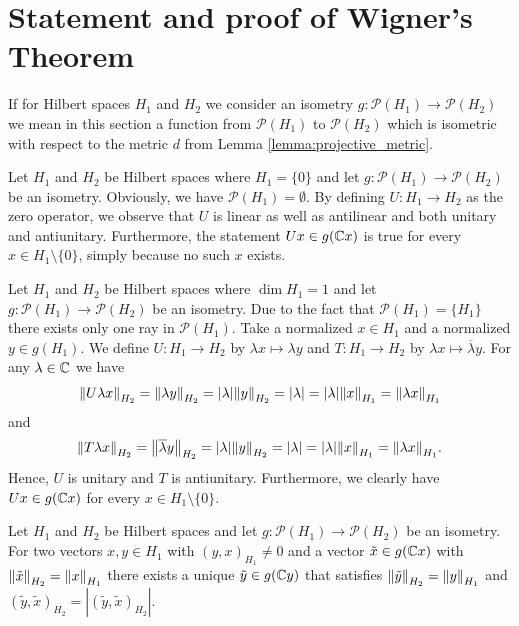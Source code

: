 \section{Statement and proof of Wigner's Theorem}

If for Hilbert spaces $H_1$ and $H_2$ we consider an isometry $g: \mathcal{P}(H_1) \to \mathcal{P}(H_2)$ we mean in this section a function from $\mathcal{P}(H_1)$ to $\mathcal{P}(H_2)$ which is isometric with respect to the metric $d$ from Lemma \ref{lemma:projective_metric}.


\begin{example} \label{example:zerodim}
	Let $H_1$ and $H_2$ be Hilbert spaces where $H_1 = \{0\}$ and let $g: \mathcal{P}(H_1) \to \mathcal{P}(H_2)$ be an isometry. Obviously, we have $\mathcal{P}(H_1) = \emptyset$. By defining $U: H_1 \to H_2$ as the zero operator, we observe that $U$ is linear as well as antilinear and both unitary and antiunitary. Furthermore, the statement $Ux \in g\pbraces{\C x}$ is true for every $x \in H_1 \setminus \{0\}$, simply because no such $x$ exists.
\end{example}


\begin{example} \label{example:onedim}
	Let $H_1$ and $H_2$ be Hilbert spaces where $\dim H_1 = 1$ and let $g: \mathcal{P}(H_1) \to \mathcal{P}(H_2)$ be an isometry. Due to the fact that $\mathcal{P}(H_1) = \{H_1\}$ there exists only one ray in $\mathcal{P}(H_1)$. Take a normalized $x \in H_1$ and a normalized $y \in g(H_1)$. We define $U: H_1 \to H_2$ by $\lambda x \mapsto \lambda y$ and $T: H_1 \to H_2$ by $\lambda x \mapsto \overline{\lambda} y$. For any $\lambda \in \C$ we have
	\begin{align*}
		\norm[H_2]{U\lambda x} = \norm[H_2]{\lambda y} = \vbraces{\lambda} \norm[H_2]{y} = \vbraces{\lambda} = \vbraces{\lambda} \norm[H_1]{x} = \norm[H_1]{\lambda x}
	\end{align*}
	and 
	\begin{align*}
		\norm[H_2]{T\lambda x} = \norm[H_2]{\overline{\lambda} y} = \vbraces{\lambda} \norm[H_2]{y} = \vbraces{\lambda} = \vbraces{\lambda} \norm[H_1]{x} = \norm[H_1]{\lambda x}.
	\end{align*}
	Hence, $U$ is unitary and $T$ is antiunitary. Furthermore, we clearly have $Ux \in g\pbraces{\C x}$ for every $x \in H_1 \setminus \{0\}$. 
\end{example}


\begin{lemma} \label{lemma:phase_adjustment_ray}
	Let $H_1$ and $H_2$ be Hilbert spaces and let $g: \mathcal{P}(H_1) \to \mathcal{P}(H_2)$ be an isometry. For two vectors $x,y \in H_1$ with $(y,x)_{H_1} \neq 0$ and a vector $\tilde{x} \in g(\C x)$ with $\norm[H_2]{\tilde{x}} = \norm[H_1]{x}$ there exists a unique $\tilde{y} \in g(\C y)$ that satisfies $\norm[H_2]{\tilde{y}} = \norm[H_1]{y}$ and $(\tilde{y},\tilde{x})_{H_2} = |(\tilde{y},\tilde{x})_{H_2}| $.
\end{lemma}

